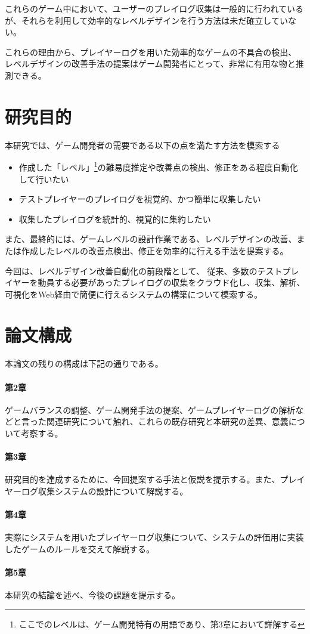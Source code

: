 これらのゲーム中において、ユーザーのプレイログ収集は一般的に行われているが、それらを利用して効率的なレベルデザインを行う方法は未だ確立していない。


これらの理由から、プレイヤーログを用いた効率的なゲームの不具合の検出、 レベルデザインの改善手法の提案はゲーム開発者にとって、非常に有用な物と推測できる。

\section{研究目的}
本研究では、ゲーム開発者の需要である以下の点を満たす方法を模索する

\begin{itemize}
  \item 作成した「レベル」\footnote{ここでのレベルは、ゲーム開発特有の用語であり、第3章において詳解する}の難易度推定や改善点の検出、修正をある程度自動化して行いたい
  \item テストプレイヤーのプレイログを視覚的、かつ簡単に収集したい
  \item 収集したプレイログを統計的、視覚的に集約したい
\end{itemize}

また、最終的には、ゲームレベルの設計作業である、レベルデザインの改善、または作成したレベルの改善点検出、修正を効率的に行える手法を提案する。

今回は、レベルデザイン改善自動化の前段階として、
従来、多数のテストプレイヤーを動員する必要があったプレイログの収集をクラウド化し、収集、解析、可視化をWeb経由で簡便に行えるシステムの構築について模索する。

\section{論文構成}
本論文の残りの構成は下記の通りである。
\paragraph{第2章}
ゲームバランスの調整、ゲーム開発手法の提案、ゲームプレイヤーログの解析などと言った関連研究について触れ、これらの既存研究と本研究の差異、意義について考察する。
\paragraph{第3章}
研究目的を達成するために、今回提案する手法と仮説を提示する。また、プレイヤーログ収集システムの設計について解説する。
\paragraph{第4章}
実際にシステムを用いたプレイヤーログ収集について、システムの評価用に実装したゲームのルールを交えて解説する。
\paragraph{第5章}
本研究の結論を述べ、今後の課題を提示する。
